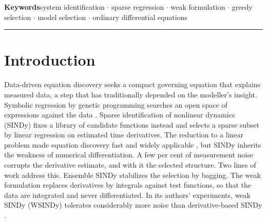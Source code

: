 \documentclass[10pt]{article}
\begin{document}
\vspace{3mm}
\noindent\textbf{Keywords}\enspace system identification $\cdot$ sparse regression $\cdot$ weak formulation $\cdot$
greedy selection $\cdot$ model selection $\cdot$ ordinary differential equations
\vspace{3mm}
{\color{rule}\hrule}
\vspace{2mm}

\section{Introduction}\label{sec:intro}

Data-driven equation discovery seeks a compact governing equation that explains measured data, a step that has
traditionally depended on the modeller's insight. Symbolic regression by genetic programming searches an open space of
expressions against the data \cite{bongard2007,schmidt2009,cranmer2023}. Sparse identification of nonlinear dynamics
(SINDy) \cite{brunton2016} fixes a library of candidate functions instead and selects a sparse subset by linear
regression on estimated time derivatives. The reduction to a linear problem made equation discovery fast and widely
applicable \cite{rudy2017,champion2019,kaheman2020,desilva2020,kaptanoglu2022}, but SINDy inherits the weakness of
numerical differentiation. A few per cent of measurement noise corrupts the derivative estimate, and with it the
selected structure. Two lines of work address this. Ensemble SINDy \cite{fasel2022} stabilizes the selection by
bagging. The weak formulation \cite{schaeffer2017,reinbold2020,messenger2021mms,messenger2021jcp} replaces derivatives
by integrals against test functions, so that the data are integrated and never differentiated. In its authors'
experiments, weak SINDy (WSINDy) tolerates considerably more noise than derivative-based SINDy \cite{messenger2021mms}.
\end{document}
